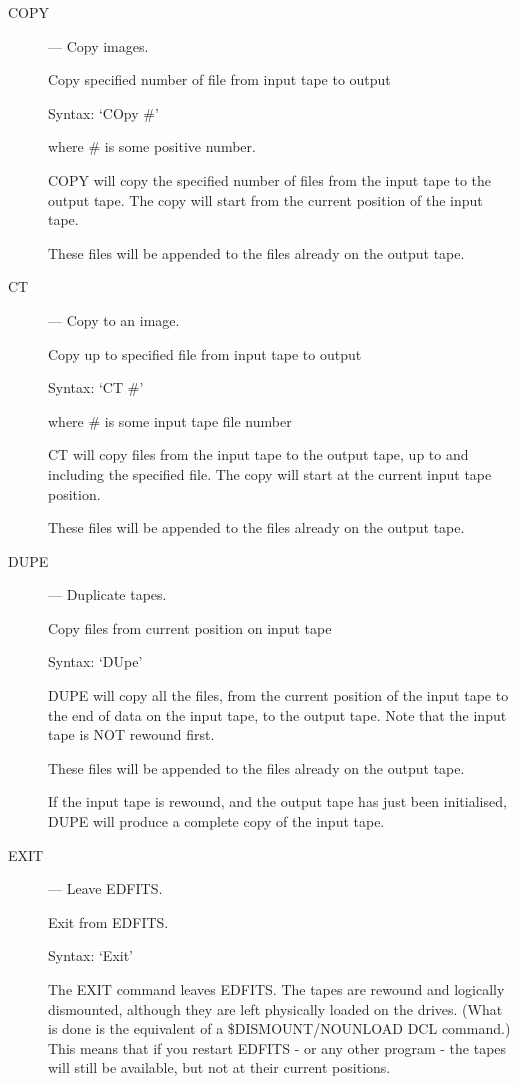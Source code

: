\begin{description}

\item [COPY] --- Copy images.

Copy specified number of file from input tape to output

Syntax:   `COpy  \#'     

where \# is some positive number.

COPY will copy the specified number of files from the input tape to 
the output tape.  The copy will start from the current position of the 
input tape.

These files will be appended to the files already on the output
tape.

\item [CT] --- Copy to an image.

Copy up to specified file from input tape to output

Syntax:  `CT \#'       

where \# is some input tape file number

CT will copy files from the input tape to the output tape, up to 
and including the specified file. The copy will start at the current
input tape position.    

These files will be appended to the files already on the output
tape.  

\item [DUPE] --- Duplicate tapes.

Copy files from current position on input tape

Syntax:    `DUpe'

DUPE will copy all the files, from the current position of the
input tape to the end of data on the input tape, to the output
tape.   Note that the input tape is NOT rewound first.

These files will be appended to the files already on the output
tape.  

If the input tape is rewound, and the output tape has just been
initialised, DUPE will produce a complete copy of the input tape.

\item [EXIT] --- Leave EDFITS.

Exit from EDFITS.

Syntax:  `Exit'

The EXIT command leaves EDFITS.  The tapes are rewound and logically
dismounted,  although they are left physically loaded on the drives.
(What is done is the equivalent of a \$DISMOUNT/NOUNLOAD DCL command.)
This means that if you restart EDFITS - or any other program - the tapes
will still be available, but not at their current positions.


\end{description}
